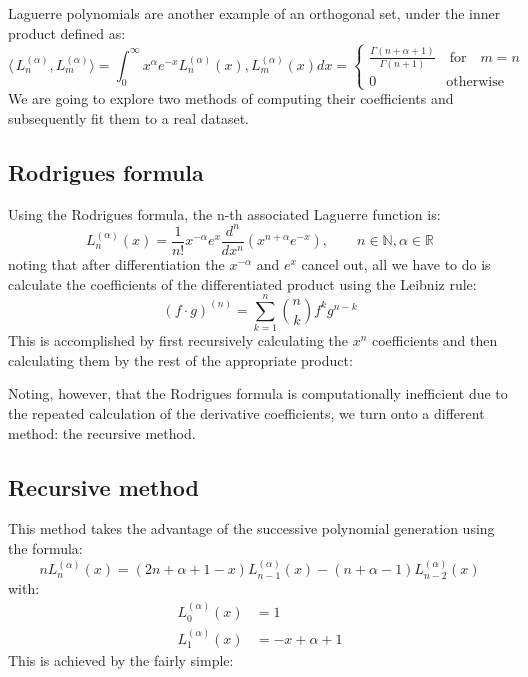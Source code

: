 \documentclass[a4paper]{article}
\numberwithin{equation}{section}
\begin{document}
Laguerre polynomials are another example of an orthogonal set, under the inner product defined as:
\begin{equation} \label{laguerre_inner_product}
\langle\,L_n^{(\alpha)}, L_m^{(\alpha)}\rangle=\int_{0}^{\infty} x^{\alpha} e^{-x} L_n^{(\alpha)}(x), L_m^{(\alpha)}(x)dx = 
\begin{cases} 
      \frac{\Gamma(n+\alpha+1)}{\Gamma(n+1)} \quad \textrm{for} \quad m = n \\
      0 \quad \quad \quad \quad \quad \textrm{otherwise}
\end{cases}
\end{equation}
We are going to explore two methods of computing their coefficients and subsequently fit them to a real dataset.

\subsection{Rodrigues formula}

Using the Rodrigues formula, the n-th associated Laguerre function is:
\begin{equation}
L_n^{(\alpha)}(x)=\frac{1}{n!}x^{-\alpha}e^x\frac{d^n}{dx^n}(x^{n+\alpha}e^{-x}), \quad\quad n \in \mathbb{N}, \alpha \in \mathbb{R}
\end{equation}
noting that after differentiation the $x^{-\alpha}$ and ${e^x}$ cancel out, all we have to do is calculate the coefficients of the differentiated product using the Leibniz rule:
\begin{equation}
(f \cdot g)^{(n)} = \sum_{k=1}^{n} \binom{n}{k} f^k g^{n-k}
\end{equation}
This is accomplished by first recursively calculating the $x^n$ coefficients and then calculating them by the rest of the appropriate product:



\noindent Noting, however, that the Rodrigues formula is computationally inefficient due to the repeated calculation of the derivative coefficients, we turn onto a different method: the recursive method.

\subsection{Recursive method}

This method takes the advantage of the successive polynomial generation using the formula:
\begin{equation}
n L_n^{(\alpha)}(x) = (2n + \alpha + 1 - x) L_{n-1}^{(\alpha)}(x) - (n + \alpha - 1) L_{n-2}^{(\alpha)}(x)
\end{equation}
with:
\begin{align}
L_0^{(\alpha)}(x) &= 1 \\
L_1^{(\alpha)}(x) &= -x+\alpha+1
\end{align}
This is achieved by the fairly simple:

\end{document}
